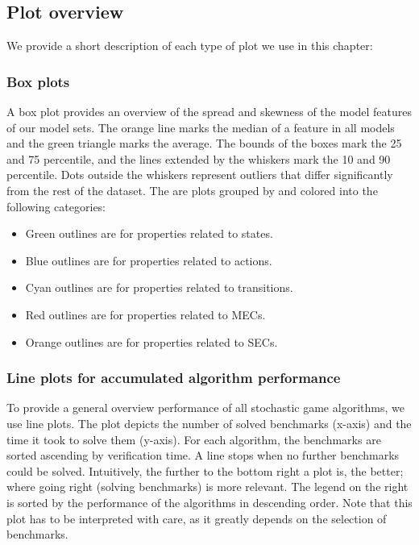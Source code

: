 \subsection{Plot overview} \label{subsec:plots}
We provide a short description of each type of plot we use in this chapter:
\subsubsection*{Box plots} \label{plot:boxplot}
A box plot provides an overview of the spread and skewness of the model features of our model sets.
The orange line marks the median of a feature in all models and the green triangle marks the
average. The bounds of the boxes mark the 25 and 75 percentile, and the lines extended
by the whiskers mark the 10 and 90 percentile. Dots outside the whiskers represent
outliers that differ significantly from the rest of the dataset.
The are plots grouped by and colored into the following categories:
\begin{itemize}
    \item Green outlines are for properties related to states. 
    \item Blue outlines are for properties related to actions. 
    \item Cyan outlines are for properties related to transitions.
    \item Red outlines are for properties related to MECs.
    \item Orange outlines are for properties related to SECs. 
\end{itemize}

\subsubsection*{Line plots for accumulated algorithm performance} \label{plot:starplot}
To provide a general overview performance of all stochastic game algorithms, we use line plots.
The plot depicts the number of solved benchmarks (x-axis) and the time it took to solve them (y-axis). 
For each algorithm, the benchmarks are sorted ascending by verification time. A line stops when no further benchmarks could be solved.
Intuitively, the further to the bottom right a plot is, the better; where going right (solving benchmarks) is more relevant.
The legend on the right is sorted by the performance of the algorithms in descending order.
Note that this plot has to be interpreted with care, as it greatly depends on the selection of benchmarks.

